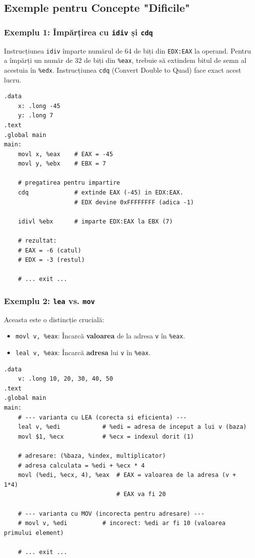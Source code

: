 \documentclass[12pt,a4paper]{article}
\begin{document}
\subsection{Exemple pentru Concepte "Dificile"}

\subsubsection{Exemplu 1: Împărțirea cu \texttt{idiv} și \texttt{cdq}}
Instrucțiunea \texttt{idiv} împarte numărul de 64 de biți din \texttt{EDX:EAX} la operand. Pentru a împărți un număr de 32 de biți din \texttt{\%eax}, trebuie să extindem bitul de semn al acestuia în \texttt{\%edx}. Instrucțiunea \texttt{cdq} (Convert Double to Quad) face exact acest lucru.

\begin{lstlisting}[language=x86asm]
.data
    x: .long -45
    y: .long 7
.text
.global main
main:
    movl x, %eax    # EAX = -45
    movl y, %ebx    # EBX = 7
    
    # pregatirea pentru impartire
    cdq             # extinde EAX (-45) in EDX:EAX. 
                    # EDX devine 0xFFFFFFFF (adica -1)
    
    idivl %ebx      # imparte EDX:EAX la EBX (7)
    
    # rezultat:
    # EAX = -6 (catul)
    # EDX = -3 (restul)
    
    # ... exit ...
\end{lstlisting}

\subsubsection{Exemplu 2: \texttt{lea} vs. \texttt{mov}}
Aceasta este o distincție crucială:
\begin{itemize}
    \item \texttt{movl v, \%eax}: Încarcă \textbf{valoarea} de la adresa \texttt{v} în \texttt{\%eax}.
    \item \texttt{leal v, \%eax}: Încarcă \textbf{adresa} lui \texttt{v} în \texttt{\%eax}.
\end{itemize}

\begin{lstlisting}[language=x86asm]
.data
    v: .long 10, 20, 30, 40, 50
.text
.global main
main:
    # --- varianta cu LEA (corecta si eficienta) ---
    leal v, %edi            # %edi = adresa de inceput a lui v (baza)
    movl $1, %ecx           # %ecx = indexul dorit (1)
    
    # adresare: (%baza, %index, multiplicator)
    # adresa calculata = %edi + %ecx * 4
    movl (%edi, %ecx, 4), %eax  # EAX = valoarea de la adresa (v + 1*4)
                                # EAX va fi 20
    
    # --- varianta cu MOV (incorecta pentru adresare) ---
    # movl v, %edi          # incorect: %edi ar fi 10 (valoarea primului element)
    
    # ... exit ...
\end{lstlisting}
\end{document}
